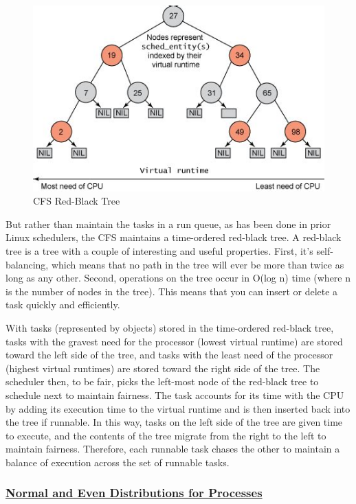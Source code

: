 \documentclass{article}
\newcommand{\code}[1]{\codeinline{\texttt{#1}}}
\begin{document}
\begin{figure}[H]
  \center
  \includegraphics[width=\linewidth]{./pics/rbtsched.jpg}
  \caption{CFS Red-Black Tree}
  \label{fig:CFS Red-Black Tree}
\end{figure}

But rather than maintain the tasks in a run queue, as has been done in prior Linux schedulers, the CFS maintains a time-ordered red-black tree. A red-black tree is a tree with a couple of interesting and useful properties. First, it's self-balancing, which means that no path in the tree will ever be more than twice as long as any other. Second, operations on the tree occur in O(log n) time (where n is the number of nodes in the tree). This means that you can insert or delete a task quickly and efficiently.

With tasks (represented by \code{sched\_entity} objects) stored in the time-ordered red-black tree, tasks with the gravest need for the processor (lowest virtual runtime) are stored toward the left side of the tree, and tasks with the least need of the processor (highest virtual runtimes) are stored toward the right side of the tree. The scheduler then, to be fair, picks the left-most node of the red-black tree to schedule next to maintain fairness. The task accounts for its time with the CPU by adding its execution time to the virtual runtime and is then inserted back into the tree if runnable. In this way, tasks on the left side of the tree are given time to execute, and the contents of the tree migrate from the right to the left to maintain fairness. Therefore, each runnable task chases the other to maintain a balance of execution across the set of runnable tasks.

\subsubsection{\underline{Normal and Even Distributions for Processes}}
\end{document}

